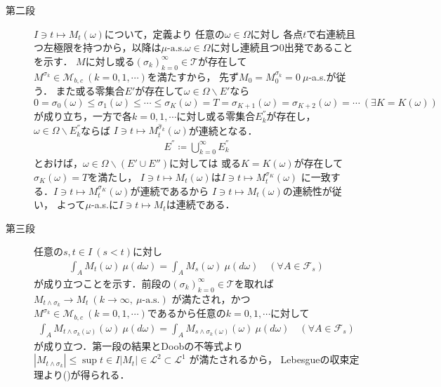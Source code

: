 \begin{prf}
\begin{description}
			\item[第二段] $I \ni t \longmapsto M_t(\omega)$について，定義より
				任意の$\omega \in \Omega$に対し
				各点$t$で右連続且つ左極限を持つから，以降は$\mbox{$\mu$-a.s.}\omega \in \Omega$に対し連続且つ0出発であることを示す．
				$M$に対し或る$\left( \sigma_k \right)_{k=0}^{\infty} \in \mathcal{T}$が存在して
				$M^{\sigma_k} \in \mathcal{M}_{b,c}\ (k=0,1,\cdots)$を満たすから，
				先ず$M_0 = M^{\sigma_k}_0 = 0\ \mu$-a.s.が従う．
				また或る零集合$E'$が存在して$\omega \in \Omega \backslash E'$なら
				$0 = \sigma_0(\omega) \leq \sigma_1(\omega) \leq \cdots \leq \sigma_{K}(\omega) = T = \sigma_{K+1}(\omega) = \sigma_{K+2}(\omega) = \cdots\ (\exists K = K(\omega))$
				が成り立ち，一方で各$k =0,1,\cdots$に対し或る零集合$E_k^{''}$が存在し，$\omega \in \Omega \backslash E_k^{''}$ならば
				$I \ni t \longmapsto M^{\hat{\sigma}_k}_t(\omega)$が連続となる．
				\begin{align}
					E^{''} \coloneqq \bigcup_{k=0}^{\infty} E_k^{''}
				\end{align}
				とおけば，$\omega \in \Omega \backslash (E' \cup E'')$に対しては
				或る$K = K(\omega)$が存在して$\sigma_K(\omega) = T$を満たし，
				$I \ni t \longmapsto M_t(\omega)$は$I \ni t \longmapsto M^{\sigma_K}_t(\omega)$
				に一致する．$I \ni t \longmapsto M^{\sigma_K}_t(\omega)$が連続であるから
				$I \ni t \longmapsto M_t(\omega)$の連続性が従い，
				よって$\mu$-a.s.に$I \ni t \longmapsto M_t$は連続である．
				
			\item[第三段] 任意の$s,t \in I\ (s < t)$に対し
				\begin{align}
					\int_A M_t(\omega)\ \mu(d\omega) = \int_A M_s(\omega)\ \mu(d\omega)
					\quad (\forall A \in \mathcal{F}_s)
					\label{thm:thm_quadratic_variation_bounded_then_M_2c_2}
				\end{align}
				が成り立つことを示す．前段の$\left( \sigma_k \right)_{k=0}^{\infty} \in \mathcal{T}$を取れば
				$M_{t \wedge \sigma_k} \longrightarrow M_t\ (k \longrightarrow \infty,\ \mbox{$\mu$-a.s.})$
				が満たされ，かつ
				$M^{\sigma_k} \in \mathcal{M}_{b,c}\ (k=0,1,\cdots)$であるから任意の$k =0,1,\cdots$に対して
				\begin{align}
					\int_A M_{t \wedge \sigma_k(\omega)}(\omega)\ \mu(d\omega) 
					= \int_A M_{s \wedge \sigma_k(\omega)}(\omega)\ \mu(d\omega)
					\quad (\forall A \in \mathcal{F}_s)
				\end{align}
				が成り立つ．第一段の結果とDoobの不等式より
				$\left| M_{t \wedge \sigma_k} \right| \leq \sup{t \in I}{\left| M_t \right|} \in \mathscr{L}^2 \subset \mathscr{L}^1$
				が満たされるから，
				Lebesgueの収束定理より()が得られる．
				\QED
		\end{description}
	\end{prf}